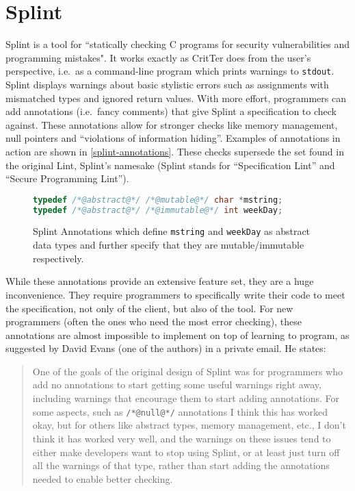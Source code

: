 \documentclass[12pt]{report}
\newcommand{\programName}{CritTer\xspace}
\begin{document}
\section{Splint}
\label{sec:splint}

Splint is a tool for ``statically checking C programs for security vulnerabilities and programming 
mistakes"\cite[p.\ 9]{splint-manual}. It works exactly as \programName does from the user's
perspective, i.e.\ as a command-line program which prints warnings to \lstinline{stdout}. 
Splint displays warnings about basic stylistic errors such as assignments with mismatched types and 
ignored return values. With more effort, programmers can add annotations (i.e.\ fancy comments) that 
give Splint a specification to check against. These annotations allow for stronger checks like memory 
management, null pointers and ``violations of information hiding''\cite[p. 9]{splint-manual}. 
Examples of annotations in action are shown in \autoref{splint-annotations}. These checks supersede 
the set found in the original Lint, Splint's namesake (Splint stands for ``Specification Lint'' and ``Secure 
Programming Lint''). 

\begin{figure}
\begin{lstlisting}[frame=single, language=C]
typedef /*@abstract@*/ /*@mutable@*/ char *mstring;
typedef /*@abstract@*/ /*@immutable@*/ int weekDay;
\end{lstlisting}
\caption[Splint Annotations]{Splint Annotations which define \lstinline{mstring} and \lstinline{weekDay} as abstract data types and further specify that they are mutable\slash immutable respectively.} 
\label{splint-annotations}
\end{figure}

While these annotations provide an extensive feature set, they are a huge inconvenience. They 
require programmers to specifically write their code to meet the specification, not only of the client, but 
also of the tool. For new programmers (often the ones who need the most error checking), these 
annotations are almost impossible to implement on top of learning to program, as suggested by  
David Evans (one of the authors) in a private email. He states:
\begin{quote} \singlespacing
One of the goals of the original design of Splint was for programmers who add no annotations to start 
getting some useful warnings right away, including warnings that encourage them to start adding 
annotations.  For some aspects, such as \lstinline{/*@null@*/} annotations I think this has worked okay, 
but for others like abstract types, memory management, etc., I don't think it has worked very well, and the 
warnings on these issues tend to either make developers want to stop using Splint, or at least just turn off 
all the warnings of that type, rather than start adding the annotations needed to enable better 
checking.\cite{evans-email} 
\end{quote}
\end{document}
